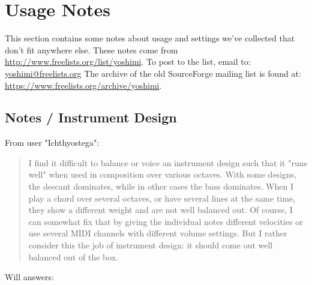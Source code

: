 %
%
%

\section{Usage Notes}
\label{sec:notes}

   This section contains some notes about usage and settings we've collected
   that don't fit anywhere else.  These notes come from 
   \url{http://www.freelists.org/list/yoshimi}.
   To post to the list, email to: \url{yoshimi@freelists.org}
   The archive of the old SourceForge mailing list is found
   at: \url{https://www.freelists.org/archive/yoshimi}.

\subsection{Notes / Instrument Design}
\label{subsec:notes_xxxxx}

   From user "Ichthyostega":

   \begin{quotation}
      I find it difficult to balance or voice an instrument design
      such that it "runs well" when used in composition over various octaves.
      With some designs, the descant dominates, while in other cases the
      bass dominates. When I play a chord over several octaves, or have
      several lines at the same time, they show a different weight
      and are not well balanced out. Of course, I can somewhat fix
      that by giving the individual notes different velocities or
      use several MIDI channels with different volume settings.
      But I rather consider this the job of instrument design:
      it should come out well balanced out of the box.
   \end{quotation}

   Will answers:

